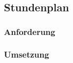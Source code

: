 \subsection{Stundenplan}
\label{sec:stundenplan}


\subsubsection{Anforderung}
\label{sec:stundenplan_anforderung}


\subsubsection{Umsetzung}
\label{sec:stundenplan_umsetzung}

